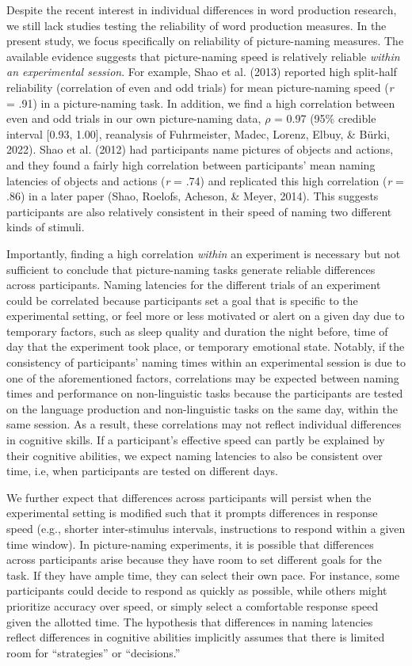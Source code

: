 \documentclass[
  man,floatsintext]{apa6}
\begin{document}
Despite the recent interest in individual differences in word production research, we still lack studies testing the reliability of word production measures. In the present study, we focus specifically on reliability of picture-naming measures. The available evidence suggests that picture-naming speed is relatively reliable \emph{within an experimental session}. For example, Shao et al. (2013) reported high split-half reliability (correlation of even and odd trials) for mean picture-naming speed (\emph{r} = .91) in a picture-naming task. In addition, we find a high correlation between even and odd trials in our own picture-naming data, \emph{\(\rho\)} = 0.97 (95\% credible interval {[}0.93, 1.00{]}, reanalysis of Fuhrmeister, Madec, Lorenz, Elbuy, \& Bürki, 2022). Shao et al. (2012) had participants name pictures of objects and actions, and they found a fairly high correlation between participants' mean naming latencies of objects and actions (\emph{r} = .74) and replicated this high correlation (\emph{r} = .86) in a later paper (Shao, Roelofs, Acheson, \& Meyer, 2014). This suggests participants are also relatively consistent in their speed of naming two different kinds of stimuli.

Importantly, finding a high correlation \emph{within} an experiment is necessary but not sufficient to conclude that picture-naming tasks generate reliable differences across participants. Naming latencies for the different trials of an experiment could be correlated because participants set a goal that is specific to the experimental setting, or feel more or less motivated or alert on a given day due to temporary factors, such as sleep quality and duration the night before, time of day that the experiment took place, or temporary emotional state. Notably, if the consistency of participants' naming times within an experimental session is due to one of the aforementioned factors, correlations may be expected between naming times and performance on non-linguistic tasks because the participants are tested on the language production and non-linguistic tasks on the same day, within the same session. As a result, these correlations may not reflect individual differences in cognitive skills. If a participant's effective speed can partly be explained by their cognitive abilities, we expect naming latencies to also be consistent over time, i.e, when participants are tested on different days.

We further expect that differences across participants will persist when the experimental setting is modified such that it prompts differences in response speed (e.g., shorter inter-stimulus intervals, instructions to respond within a given time window). In picture-naming experiments, it is possible that differences across participants arise because they have room to set different goals for the task. If they have ample time, they can select their own pace. For instance, some participants could decide to respond as quickly as possible, while others might prioritize accuracy over speed, or simply select a comfortable response speed given the allotted time. The hypothesis that differences in naming latencies reflect differences in cognitive abilities implicitly assumes that there is limited room for ``strategies'' or ``decisions.''
\end{document}
